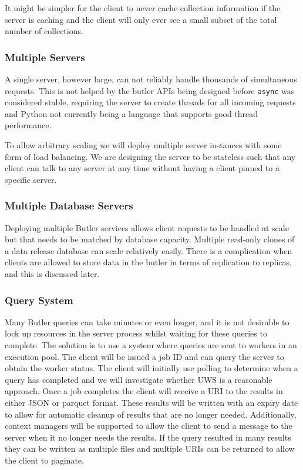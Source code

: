 It might be simpler for the client to never cache collection information if the server is caching and the client will only ever see a small subset of the total number of collections.

\subsubsection{Multiple Servers}\label{multiple-servers}

A single server, however large, can not reliably handle thousands of simultaneous requests.
This is not helped by the butler APIs being designed before \texttt{async} was considered stable, requiring the server to create threads for all incoming requests and Python not currently being a language that supports good thread performance.

To allow arbitrary scaling we will deploy multiple server instances with some form of load balancing.
We are designing the server to be stateless such that any client can talk to any server at any time without having a client pinned to a specific server.

\subsubsection{Multiple Database Servers}\label{multiple-database-servers}

Deploying multiple Butler services allows client requests to be handled at scale but that needs to be matched by database capacity.
Multiple read-only clones of a data release database can scale relatively easily.
There is a complication when clients are allowed to store data in the butler in terms of replication to replicas, and this is discussed later.

\subsubsection{Query System}\label{query-system}

Many Butler queries can take minutes or even longer, and it is not desirable to lock up resources in the server process whilst waiting for these queries to complete.
The solution is to use a system where queries are sent to workers in an execution pool.
The client will be issued a job ID and can query the server to obtain the worker status.
The client will initially use polling to determine when a query has completed and we will investigate whether UWS \cite{2016ivoa.spec.1024H} is a reasonable approach.
Once a job completes the client will receive a URI to the results in either JSON or parquet format.
These results will be written with an expiry date to allow for automatic cleanup of results that are no longer
needed.
Additionally, context managers will be supported to allow the client to send a message to the server when it no longer needs the results.
If the query resulted in many results they can be written as multiple files and multiple URIs can be returned to allow the client to paginate.

